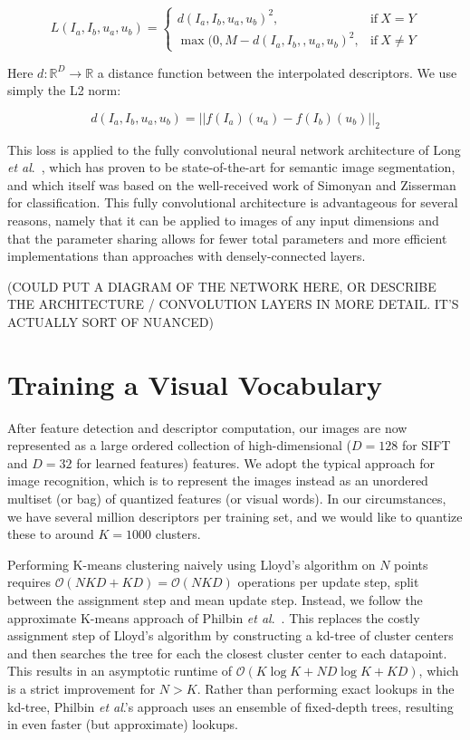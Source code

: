 \begin{equation}
L(I_a, I_b, u_a, u_b) = \begin{cases}
d(I_a, I_b, u_a, u_b)^2 , & \text{if}\ X = Y \\
\max(0, M - d(I_a, I_b, , u_a, u_b)^2, & \text{if}\ X \ne Y
\end{cases}
\end{equation}

Here $d : \mathbb{R}^D \to \mathbb{R}$ a distance function between the interpolated descriptors. We use simply the L2 norm:

\begin{equation}
d(I_a, I_b, u_a, u_b) = ||f(I_a)(u_a) - f(I_b)(u_b)||_2
\end{equation}

This loss is applied to the fully convolutional neural network architecture of Long \textit{et al}.\ \cite{long2015fully}, which has proven to be state-of-the-art for semantic image segmentation, and which itself was based on the well-received work of Simonyan and Zisserman \cite{simonyan2014very} for classification. This fully convolutional architecture is advantageous for several reasons, namely that it can be applied to images of any input dimensions and that the parameter sharing allows for fewer total parameters and more efficient implementations than approaches with densely-connected layers.

(COULD PUT A DIAGRAM OF THE NETWORK HERE, OR DESCRIBE THE ARCHITECTURE / CONVOLUTION LAYERS IN MORE DETAIL. IT'S ACTUALLY SORT OF NUANCED)

\section{Training a Visual Vocabulary}

After feature detection and descriptor computation, our images are now represented as a large ordered collection of high-dimensional ($D=128$ for SIFT and $D=32$ for learned features) features. We adopt the typical approach for image recognition, which is to represent the images instead as an unordered multiset (or bag) of quantized features (or visual words). In our circumstances, we have several million descriptors per training set, and we would like to quantize these to around $K=1000$ clusters.

Performing K-means clustering naively using Lloyd's algorithm \cite{lloyd1982least} on $N$ points requires $\mathcal{O}(N K D + K D) = \mathcal{O}(N K D)$ operations per update step, split between the assignment step and mean update step. Instead, we follow the approximate K-means approach of Philbin \textit{et al}.\ \cite{philbin2007object}. This replaces the costly assignment step of Lloyd's algorithm by constructing a kd-tree of cluster centers and then searches the tree for each the closest cluster center to each datapoint. This results in an asymptotic runtime of $\mathcal{O}(K \log K + N D \log K + K D)$, which is a strict improvement for $N > K$. Rather than performing exact lookups in the kd-tree, Philbin \textit{et al}.'s approach uses an ensemble of fixed-depth trees, resulting in even faster (but approximate) lookups.

